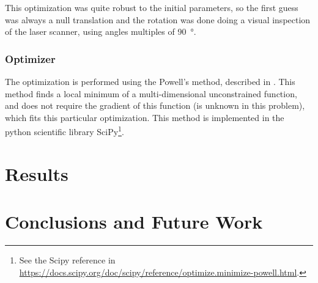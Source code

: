 \documentclass[conference]{IEEEtran}
\begin{document}
This optimization was quite robust to the initial parameters, so the first guess was always a null translation and the rotation was done doing a visual inspection of the laser scanner, using angles multiples of \SI{90}{\degree}.

\subsubsection{Optimizer}

The optimization is performed using the Powell's method, described in \cite{powell64}. This method finds a local minimum of a multi-dimensional unconstrained function, and does not require the gradient of this function (is unknown in this problem), which fits this particular optimization. This method is implemented in the python scientific library SciPy\footnote{See the Scipy reference in \url{https://docs.scipy.org/doc/scipy/reference/optimize.minimize-powell.html}.}.


\section{Results}\label{sec:results}

\section{Conclusions and Future Work}\label{sec:conclusions}




{\small


}
\end{document}
